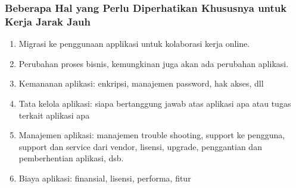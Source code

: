 \documentclass[aspectratio=169]{beamer}
\begin{document}
\begin{frame}
	\frametitle{Beberapa Hal yang Perlu Diperhatikan Khususnya untuk Kerja Jarak Jauh}
	\begin{enumerate}
		\item Migrasi ke penggunaan applikasi untuk kolaborasi kerja online.
		\item Perubahan proses bisnis, kemungkinan juga akan ada perubahan aplikasi.
		\item Kemananan aplikasi: enkripsi, manajemen password, hak akses, dll
		\item Tata kelola aplikasi: siapa bertanggung jawab atas aplikasi apa atau tugas terkait aplikasi apa
		\item Manajemen aplikasi: manajemen trouble shooting, support ke pengguna, support dan service dari vendor, lisensi, upgrade, penggantian dan pemberhentian aplikasi, dsb.
		\item Biaya aplikasi: finansial, lisensi, performa, fitur
	\end{enumerate}
\end{frame}
\end{document}
